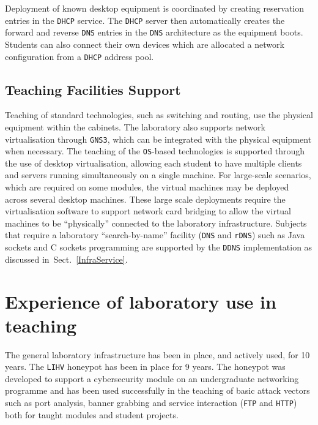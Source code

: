 \documentclass{ieeeaccess}
\begin{document}
Deployment of known desktop equipment is coordinated by creating reservation
entries in the \texttt{DHCP} service. The \texttt{DHCP} server then
automatically creates the forward and reverse \texttt{DNS} entries in the
\texttt{DNS} architecture as the equipment boots. Students can also connect
their own devices which are allocated a network configuration from a
\texttt{DHCP} address pool.

\subsection{Teaching Facilities Support}

Teaching of standard technologies, such as switching and routing, use the
physical equipment within the cabinets. The laboratory also supports network
virtualisation through \texttt{GNS3}, which can be integrated with the physical
equipment when necessary. The teaching of the \texttt{OS}-based technologies is
supported through the use of desktop virtualisation, allowing each student to
have multiple clients and servers running simultaneously on a single machine.
For large-scale scenarios, which are required on some modules, the virtual
machines may be deployed across several desktop machines. These large scale
deployments require the virtualisation software to support network card
bridging to allow the virtual machines to be ``physically'' connected to the
laboratory infrastructure.  Subjects that require a laboratory
``search-by-name'' facility (\texttt{DNS} and \texttt{rDNS}) such as Java
sockets and C sockets programming are supported by the \texttt{DDNS}
implementation as discussed in~Sect.~\ref{InfraService}.

\section{Experience of laboratory use in teaching}\label{sec:Results}

The general laboratory infrastructure has been in place, and actively used, for
10 years. The \texttt{LIHV} honeypot has been in place for 9 years. The
honeypot was developed to support a cybersecurity module on an undergraduate
networking programme and has been used successfully in the teaching of basic
attack vectors such as port analysis, banner grabbing and service interaction
(\texttt{FTP} and \texttt{HTTP}) both for taught modules and student projects.
\end{document}
